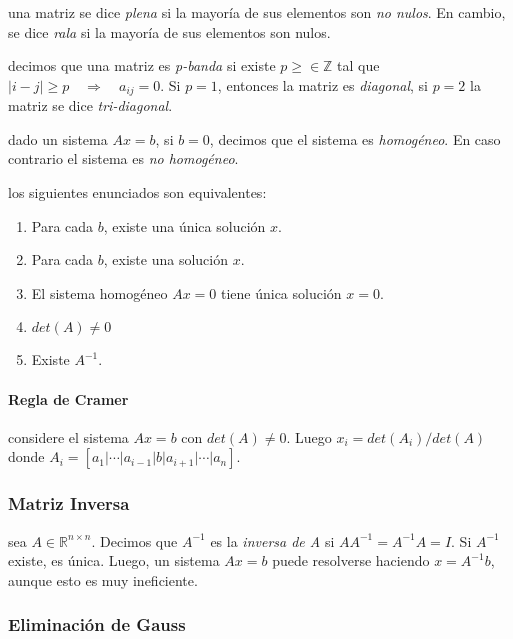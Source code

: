 \Definicion una matriz se dice \emph{plena} si la mayoría de sus
elementos son \emph{no nulos}. En cambio, se dice \emph{rala} si la
mayoría de sus elementos son nulos.

\Definicion decimos que una matriz es \emph{p-banda} si existe
\(p \geq \in \ensuremath{\mathbb{Z}}\) tal que
\(|i - j| \geq p \ensuremath{\quad\Longrightarrow\quad}a_{ij} = 0\). Si
\(p = 1\), entonces la matriz es \emph{diagonal}, si \(p = 2\) la matriz
se dice \emph{tri-diagonal}.

\Definicion dado un sistema \(Ax = b\), si \(b = 0\), decimos que el
sistema es \emph{homogéneo}. En caso contrario el sistema es \emph{no
homogéneo}.

\Teorema los siguientes enunciados son equivalentes:

\begin{enumerate}
\def\labelenumi{\arabic{enumi}.}
\tightlist
\item
  Para cada \(b\), existe una única solución \(x\).
\item
  Para cada \(b\), existe una solución \(x\).
\item
  El sistema homogéneo \(Ax = 0\) tiene única solución \(x=0\).
\item
  \(det(A) \neq 0\)
\item
  Existe \(A^{-1}\).
\end{enumerate}

\hypertarget{regla-de-cramer}{%
\paragraph{Regla de Cramer}\label{regla-de-cramer}}

considere el sistema \(Ax = b\) con \(det(A) \neq 0\). Luego
\(x_i = det(A_i) / det(A)\) donde
\(A_i = [a_1 | \cdots | a_{i-1} | b | a_{i+1} | \cdots | a_n]\).

\hypertarget{matriz-inversa}{%
\subsubsection{Matriz Inversa}\label{matriz-inversa}}

\Definicion sea \(A \in \ensuremath{\mathbb{R}}^{n \times n}\). Decimos
que \(A^{-1}\) es la \emph{inversa de A} si \(AA^{-1} = A^{-1}A = I\).
Si \(A^{-1}\) existe, es única. Luego, un sistema \(Ax = b\) puede
resolverse haciendo \(x = A^{-1}b\), aunque esto es muy ineficiente.

\hypertarget{eliminaciuxf3n-de-gauss}{%
\subsubsection{Eliminación de Gauss}\label{eliminaciuxf3n-de-gauss}}

